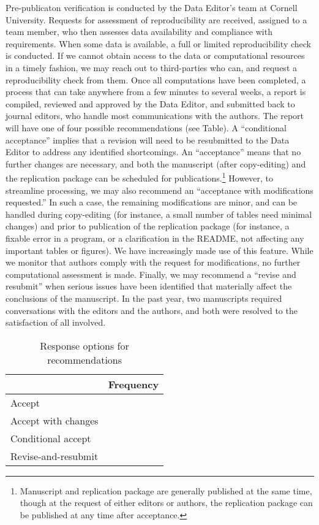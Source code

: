 \documentclass[PP]{AEA}
\begin{document}
Pre-publicaton verification is conducted by the Data Editor's team at Cornell University. 
Requests for assessment of reproducibility are received, assigned to a team member, who then assesses data availability and compliance with requirements. When some data is available, a full or limited reproducibility check is conducted. If we cannot obtain access to the data or computational resources in a timely fashion, we may reach out to third-parties who can, and request a reproducibility check from them. Once all computations have been completed, a process that can take anywhere from a few minutes to several weeks, a report is compiled, reviewed and approved by the Data Editor, and submitted back to journal editors, who handle most communications with the authors. The report will have  one of four possible recommendations (see Table). A ``conditional acceptance'' implies that a revision will need to be resubmitted to the Data Editor to address any identified shortcomings. An ``acceptance'' means that no further changes are necessary, and both the manuscript (after copy-editing) and the replication package can be scheduled for publications.\footnote{Manuscript and replication package are generally published at the same time, though at the request of either editors or authors, the replication package can be published at any time after acceptance.} However, to streamline processing, we may also recommend an ``acceptance with modifications requested.'' In such a case, the remaining modifications are minor, and can be handled during copy-editing (for instance, a small number of tables need minimal changes) and prior to publication of the replication package (for instance, a fixable error in a program, or a clarification in the README, not affecting any important tables or figures). We have increasingly made use of this feature. While we monitor that authors comply with the request for modifications, no further computational assessment is made. Finally, we may recommend a ``revise and resubmit'' when serious issues have been identified that materially affect the conclusions of the manuscript. In the past year, two manuscripts required conversations with the editors and the authors, and both were resolved to the satisfaction of all involved.

\begin{table}[t]
    \caption{Response options for recommendations}
    \label{tab:responses}
    \centering
    \begin{tabular}{lr}
    \toprule
               & Frequency \\
               \midrule
        Accept &  \\
        Accept with changes &\\
        Conditional accept &\\
        Revise-and-resubmit & \\
        \bottomrule
    \end{tabular}
\end{table}
\end{document}
